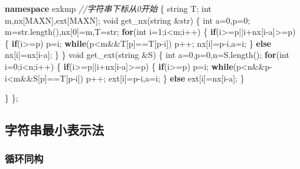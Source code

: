 \documentclass[
]{article}
\newenvironment{Shaded}{}{}
\newcommand{\CommentTok}[1]{\textcolor[rgb]{0.38,0.63,0.69}{\textit{#1}}}
\newcommand{\ControlFlowTok}[1]{\textcolor[rgb]{0.00,0.44,0.13}{\textbf{#1}}}
\newcommand{\DataTypeTok}[1]{\textcolor[rgb]{0.56,0.13,0.00}{#1}}
\newcommand{\DecValTok}[1]{\textcolor[rgb]{0.25,0.63,0.44}{#1}}
\newcommand{\KeywordTok}[1]{\textcolor[rgb]{0.00,0.44,0.13}{\textbf{#1}}}
\newcommand{\NormalTok}[1]{#1}
\begin{document}
\begin{Shaded}
\begin{Highlighting}[]
\KeywordTok{namespace}\NormalTok{ exkmp }\CommentTok{//字符串下标从0开始}
\NormalTok{\{}
\NormalTok{    string T;}
    \DataTypeTok{int}\NormalTok{ m,nx[MAXN],ext[MAXN];}
    \DataTypeTok{void}\NormalTok{ get\_nx(string \&str)}
\NormalTok{    \{}
        \DataTypeTok{int}\NormalTok{ a=}\DecValTok{0}\NormalTok{,p=}\DecValTok{0}\NormalTok{;}
\NormalTok{        m=str.length(),nx[}\DecValTok{0}\NormalTok{]=m,T=str;}
        \ControlFlowTok{for}\NormalTok{(}\DataTypeTok{int}\NormalTok{ i=}\DecValTok{1}\NormalTok{;i\textless{}m;i++)}
\NormalTok{        \{}
            \ControlFlowTok{if}\NormalTok{(i\textgreater{}=p||i+nx[i{-}a]\textgreater{}=p)}
\NormalTok{            \{}
                \ControlFlowTok{if}\NormalTok{(i\textgreater{}=p) p=i;}
                \ControlFlowTok{while}\NormalTok{(p\textless{}m\&\&T[p]==T[p{-}i]) p++;}
\NormalTok{                nx[i]=p{-}i,a=i;}
\NormalTok{            \}}
            \ControlFlowTok{else}\NormalTok{ nx[i]=nx[i{-}a];}
\NormalTok{        \}}
\NormalTok{    \}}
    \DataTypeTok{void}\NormalTok{ get\_ext(string \&S)}
\NormalTok{    \{}
        \DataTypeTok{int}\NormalTok{ a=}\DecValTok{0}\NormalTok{,p=}\DecValTok{0}\NormalTok{,n=S.length();}
        \ControlFlowTok{for}\NormalTok{(}\DataTypeTok{int}\NormalTok{ i=}\DecValTok{0}\NormalTok{;i\textless{}n;i++)}
\NormalTok{        \{}
            \ControlFlowTok{if}\NormalTok{(i\textgreater{}=p||i+nx[i{-}a]\textgreater{}=p)}
\NormalTok{            \{}
                \ControlFlowTok{if}\NormalTok{(i\textgreater{}=p) p=i;}
                \ControlFlowTok{while}\NormalTok{(p\textless{}n\&\&p{-}i\textless{}m\&\&S[p]==T[p{-}i]) p++;}
\NormalTok{                ext[i]=p{-}i,a=i;}
\NormalTok{            \}}
            \ControlFlowTok{else}\NormalTok{ ext[i]=nx[i{-}a];}
\NormalTok{        \}}

\NormalTok{    \}}
\NormalTok{\};}
\end{Highlighting}
\end{Shaded}

\hypertarget{ux5b57ux7b26ux4e32ux6700ux5c0fux8868ux793aux6cd5}{%
\subsection{字符串最小表示法}\label{ux5b57ux7b26ux4e32ux6700ux5c0fux8868ux793aux6cd5}}

\hypertarget{ux5faaux73afux540cux6784}{%
\subsubsection{循环同构}\label{ux5faaux73afux540cux6784}}
\end{document}
